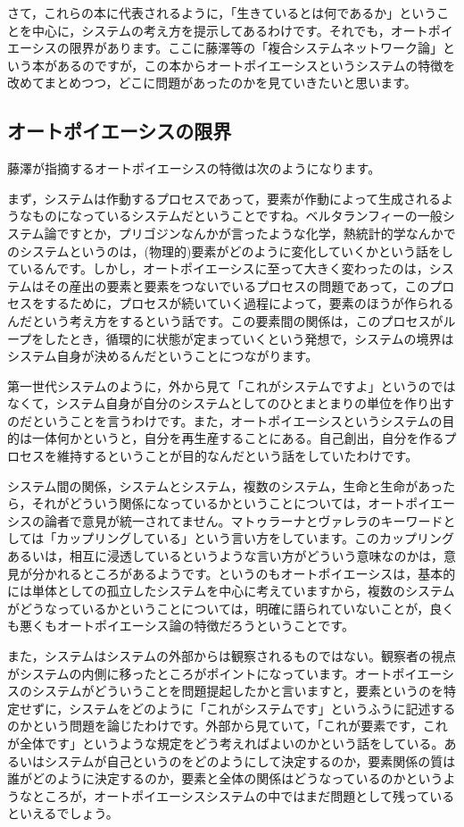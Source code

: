 \documentclass{ltjsbook}
\begin{document}
さて，これらの本に代表されるように，「生きているとは何であるか」ということを中心に，システムの考え方を提示してあるわけです。それでも，オートポイエーシスの限界があります。ここに藤澤等の「複合システムネットワーク論」という本があるのですが\parencite{fujisawaNetwork}，この本からオートポイエーシスというシステムの特徴を改めてまとめつつ，どこに問題があったのかを見ていきたいと思います。

\subsection{オートポイエーシスの限界}

藤澤が指摘するオートポイエーシスの特徴は次のようになります。

まず，システムは作動するプロセスであって，要素が作動によって生成されるようなものになっているシステムだということですね。ベルタランフィーの一般システム論ですとか，プリゴジンなんかが言ったような化学，熱統計的学なんかでのシステムというのは，(物理的)要素がどのように変化していくかという話をしているんです。しかし，オートポイエーシスに至って大きく変わったのは，システムはその産出の要素と要素をつないでいるプロセスの問題であって，このプロセスをするために，プロセスが続いていく過程によって，要素のほうが作られるんだという考え方をするという話です。この要素間の関係は，このプロセスがループをしたとき，循環的に状態が定まっていくという発想で，システムの境界はシステム自身が決めるんだということにつながります。

第一世代システムのように，外から見て「これがシステムですよ」というのではなくて，システム自身が自分のシステムとしてのひとまとまりの単位を作り出すのだということを言うわけです。また，オートポイエーシスというシステムの目的は一体何かというと，自分を再生産することにある。自己創出，自分を作るプロセスを維持するということが目的なんだという話をしていたわけです。

システム間の関係，システムとシステム，複数のシステム，生命と生命があったら，それがどういう関係になっているかということについては，オートポイエーシスの論者で意見が統一されてません。マトゥラーナとヴァレラのキーワードとしては「カップリングしている」という言い方をしています。このカップリングあるいは，相互に浸透しているというような言い方がどういう意味なのかは，意見が分かれるところがあるようです。というのもオートポイエーシスは，基本的には単体としての孤立したシステムを中心に考えていますから，複数のシステムがどうなっているかということについては，明確に語られていないことが，良くも悪くもオートポイエーシス論の特徴だろうということです。

また，システムはシステムの外部からは観察されるものではない。観察者の視点がシステムの内側に移ったところがポイントになっています。オートポイエーシスのシステムがどういうことを問題提起したかと言いますと，要素というのを特定せずに，システムをどのように「これがシステムです」というふうに記述するのかという問題を論じたわけです。外部から見ていて，「これが要素です，これが全体です」というような規定をどう考えればよいのかという話をしている。あるいはシステムが自己というのをどのようにして決定するのか，要素関係の質は誰がどのように決定するのか，要素と全体の関係はどうなっているのかというようなところが，オートポイエーシスシステムの中ではまだ問題として残っているといえるでしょう。
\end{document}
